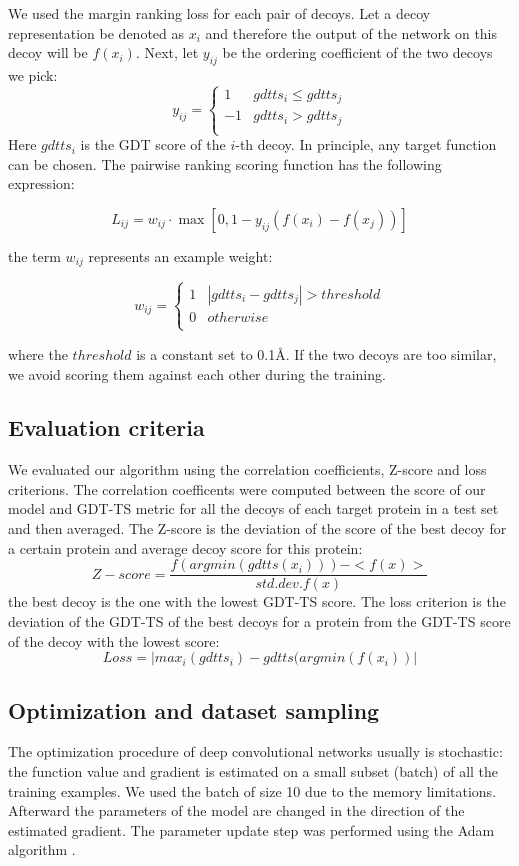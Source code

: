 \documentclass[letter,10pt]{article}
\begin{document}
We used the margin ranking loss for each pair of decoys. Let a decoy representation be denoted as $x_i$ and therefore the output
of the network on this decoy will be $f(x_i)$. Next, let $y_{ij}$ be the ordering coefficient of the two decoys we pick:
$$
y_{ij} = \begin{cases}
               1& gdtts_i \leq gdtts_j \\
               -1& gdtts_i > gdtts_j \\
            \end{cases}
$$
Here $gdtts_i$ is the GDT score of the $i$-th decoy. In principle, any target function can be chosen. 
The pairwise ranking scoring function has the following expression:

$$ L_{ij} = w_{ij} \cdot \max \left[ 0, 1 - y_{ij} \left( f \left( x_i \right) - f \left( x_j \right) \right) \right] $$

the term $w_{ij}$ represents an example weight:

$$
w_{ij} = \begin{cases}
               1& \left| gdtts_i - gdtts_j \right| > threshold \\
               0& otherwise \\ 
            \end{cases}
$$

where the $threshold$ is a constant set to 0.1{\AA}. If the two decoys are too similar, 
we avoid scoring them against each other during the training.



\subsection{Evaluation criteria}
We evaluated our algorithm using the correlation coefficients, Z-score and loss criterions. The correlation coefficents 
were computed between the score of 
our model and GDT-TS metric for all the decoys of each target protein in a test set and then averaged. 
The Z-score is the deviation of the score of 
the best decoy for a certain protein and average decoy score for this protein:
$$ 
Z-score = \frac{f( argmin(gdtts(x_i)) ) - <f(x)>}{std.dev.f(x)}
$$ 
the best decoy is the one with the lowest GDT-TS score. 
The loss criterion is the deviation of the GDT-TS of the best decoys for a protein from the GDT-TS score of the decoy with the lowest score:
$$ 
Loss = | max_i( gdtts_i ) - gdtts( argmin(f(x_i) ) |
$$ 

\subsection{Optimization and dataset sampling}
The optimization procedure of deep convolutional networks usually is stochastic: the function value and gradient 
is estimated on a small subset (batch) of all the training 
examples. We used the batch of size 10 due to the memory limitations. Afterward the parameters of the model are 
changed in the direction of the estimated gradient.
The parameter update step was performed using the Adam algorithm \cite{}. 
\end{document}
